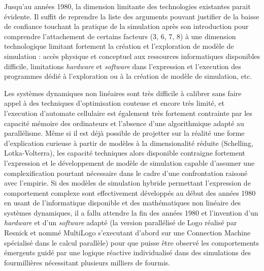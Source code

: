 Jusqu'au années 1980, la dimension limitante des technologies existantes parait évidente. Il suffit de reprendre la liste des arguments pouvant justifier de la baisse de confiance touchant la pratique de la simulation après son introduction pour comprendre l'attachement de certains facteurs (3, 6, 7, 8) à une dimension technologique limitant fortement la création et l'exploration de modèle de simulation : accès physique et conceptuel aux ressources informatiques disponibles difficile, limitations \textit{hardware} et \textit{software} dans l'expression et l'execution des programmes dédié à l'exploration ou à la création de modèle de simulation, etc.

%

Les systèmes dynamiques non linéaires sont très difficile à calibrer sans faire appel à des techniques d'optimisation couteuse et encore très limité, et l'execution d'automate cellulaire est également très fortement contrainte par les capacité mémoire des ordinateurs et l'absence d'une algorithmique adapté au parallélisme. Même si il est déjà possible de projetter sur la réalité une forme d'explication curieuse à partir de modèles à la dimensionalité réduite (Schelling, Lotka-Volterra), les capacité techniques alors disponible contraigne fortement l'expression et le développement de modèle de simulation capable d'assumer une complexification pourtant nécessaire dans le cadre d'une confrontation raisoné avec l'empirie. Si des modèles de simulation hybride permettant l'expression de comportement complexe sont effectivement développés au début des années 1980 en usant de l'informatique disponible et des mathématiques non linéaire des systèmes dynamiques, il a fallu attendre la fin des années 1980 et l'invention d'un \textit{hardware} et d'un \textit{software} adapté (la version parallélisé de Logo réalisé par Resnick et nommé MultiLogo s'executant d'abord sur une Connection Machine spécialisé dans le calcul parallèle) pour que puisse être observé les comportements émergents guidé par une logique réactive individualisé dans des simulations des fourmillières nécessitant plusieurs milliers de fourmis. 

